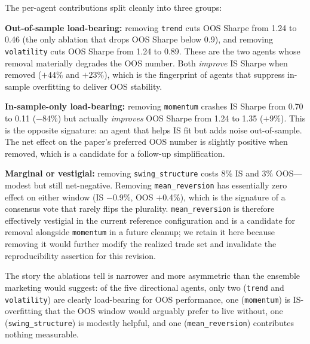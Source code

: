 \documentclass{article}
\begin{document}
The per-agent contributions split cleanly into three groups:

\textbf{Out-of-sample load-bearing:} removing \texttt{trend} cuts OOS Sharpe from 1.24 to 0.46 (the only ablation that drops OOS Sharpe below 0.9), and removing \texttt{volatility} cuts OOS Sharpe from 1.24 to 0.89. These are the two agents whose removal materially degrades the OOS number. Both \emph{improve} IS Sharpe when removed ($+44\%$ and $+23\%$), which is the fingerprint of agents that suppress in-sample overfitting to deliver OOS stability.

\textbf{In-sample-only load-bearing:} removing \texttt{momentum} crashes IS Sharpe from 0.70 to 0.11 ($-$84\%) but actually \emph{improves} OOS Sharpe from 1.24 to 1.35 ($+$9\%). This is the opposite signature: an agent that helps IS fit but adds noise out-of-sample. The net effect on the paper's preferred OOS number is slightly positive when removed, which is a candidate for a follow-up simplification.

\textbf{Marginal or vestigial:} removing \texttt{swing\_structure} costs 8\% IS and 3\% OOS---modest but still net-negative. Removing \texttt{mean\_reversion} has essentially zero effect on either window (IS $-$0.9\%, OOS $+$0.4\%), which is the signature of a consensus vote that rarely flips the plurality. \texttt{mean\_reversion} is therefore effectively vestigial in the current reference configuration and is a candidate for removal alongside \texttt{momentum} in a future cleanup; we retain it here because removing it would further modify the realized trade set and invalidate the reproducibility assertion for this revision.

The story the ablations tell is narrower and more asymmetric than the ensemble marketing would suggest: of the five directional agents, only two (\texttt{trend} and \texttt{volatility}) are clearly load-bearing for OOS performance, one (\texttt{momentum}) is IS-overfitting that the OOS window would arguably prefer to live without, one (\texttt{swing\_structure}) is modestly helpful, and one (\texttt{mean\_reversion}) contributes nothing measurable.
\end{document}
